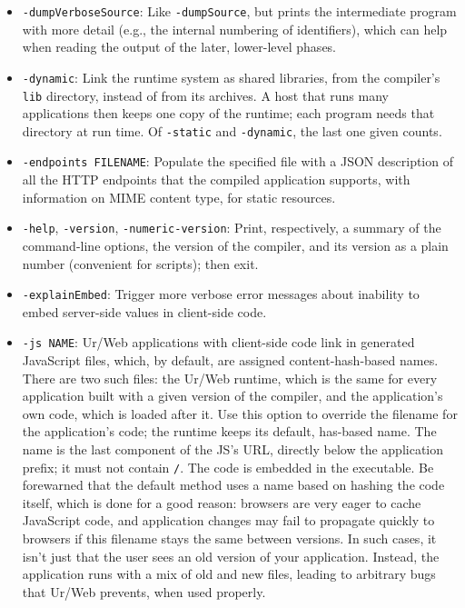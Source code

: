\documentclass{article}
\begin{document}
\begin{itemize}
\item \texttt{-dumpVerboseSource}: Like \texttt{-dumpSource}, but prints the intermediate program with more detail (e.g., the internal numbering of identifiers), which can help when reading the output of the later, lower-level phases.
\item \texttt{-dynamic}: Link the runtime system as shared libraries, from the compiler's \texttt{lib} directory, instead of from its archives.  A host that runs many applications then keeps one copy of the runtime; each program needs that directory at run time.  Of \texttt{-static} and \texttt{-dynamic}, the last one given counts.
\item \texttt{-endpoints FILENAME}: Populate the specified file with a JSON description of all the HTTP endpoints that the compiled application supports, with information on MIME content type, for static resources.

\item \texttt{-help}, \texttt{-version}, \texttt{-numeric-version}: Print, respectively, a summary of the command-line options, the version of the compiler, and its version as a plain number (convenient for scripts); then exit.
\item \texttt{-explainEmbed}: Trigger more verbose error messages about inability to embed server-side values in client-side code.

\item \texttt{-js NAME}: Ur/Web applications with client-side code link in generated JavaScript files, which, by default, are assigned content-hash-based names.  There are two such files: the Ur/Web runtime, which is the same for every application built with a given version of the compiler, and the application's own code, which is loaded after it.  Use this option to override the filename for the application's code; the runtime keeps its default, has-based name.  The name is the last component of the JS's URL, directly below the application prefix; it must not contain \texttt{/}.  The code is embedded in the executable.  Be forewarned that the default method uses a name based on hashing the code itself, which is done for a good reason: browsers are very eager to cache JavaScript code, and application changes may fail to propagate quickly to browsers if this filename stays the same between versions.  In such cases, it isn't just that the user sees an old version of your application.  Instead, the application runs with a mix of old and new files, leading to arbitrary bugs that Ur/Web prevents, when used properly.


\end{itemize}
\end{document}
